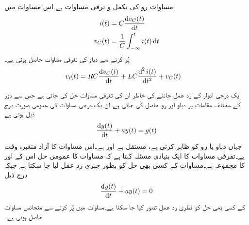 مساوات  رو   کی تکمل و ترقی مساوات ہے۔اس مساوات میں 
\begin{align*}
i(t)&=C\frac{\dif v_C(t)}{\dif t}\\
v_C(t)&=\frac{1}{C}\int_{-\infty}^{t} i(t)\dif t
\end{align*}
پُر کرنے سے دباو  کی تفرقی مساوات حاصل ہوتی ہے۔
\begin{align}\label{مساوات_عارضی_تکمل_و_تفرقی_ب}
v_i(t)&=R C\frac{\dif v_C(t)}{\dif t}+LC\frac{\dif^{\,2} i(t)}{\dif t^2}+v_C(t)
\end{align}

ایک درجی ادوار کے رد عمل جاننے کی خاطر ان کی تفرقی مساوات حل کی جاتی ہے جس سے دور کے مختلف مقامات پر دباو اور رو حاصل کی جاتی ہے۔ان یک درجی مساوات کی عمومی صورت درج ذیل ہوتی ہے
\begin{align}\label{مساوات_عارضی_یک_درجی_عمومی_مساوات}
\frac{\dif y(t)}{\dif t}+a y(t)= g(t)
\end{align}
جہاں  دباو یا رو کو ظاہر کرتی ہے،  مستقل ہے اور   ہے۔اس مساوات کا آزاد متغیرہ وقت  ہے۔تفرقی مساوات کا ایک بنیادی مسئلہ کہتا ہے کہ مساوات  کا عمومی حل اس کے   اور   کا مجموعہ ہے۔مساوات  کے کسی بھی حل کو بطور جبری رد عمل لیا جا سکتا ہے جبکہ درج ذیل 
\begin{align}\label{مساوات_عارضی_یک_درجی_عمومی_مساوات_ب}
\frac{\dif y(t)}{\dif t}+a y(t)=0
\end{align}
 کے کسی بھی حل کو فطری رد عمل تصور کیا جا سکتا ہے۔مساوات  میں  پُر کرنے سے متجانس مساوات  حاصل ہوتی ہے۔

